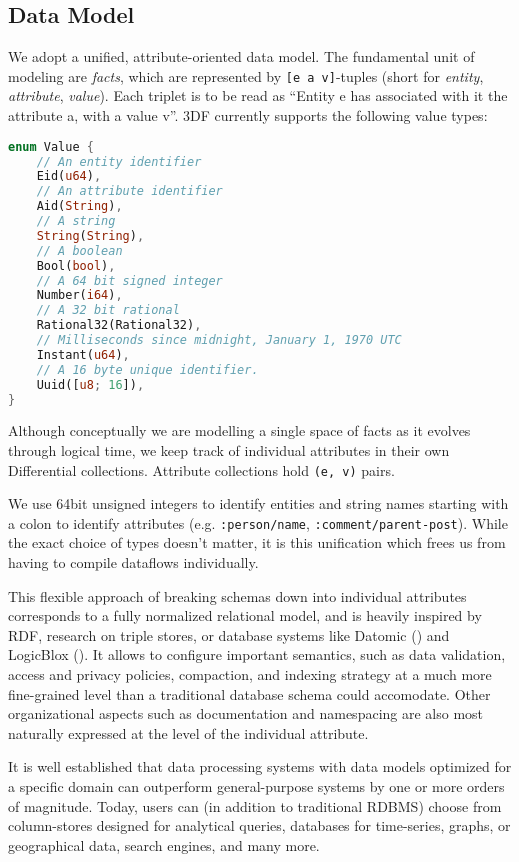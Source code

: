 \documentclass[../index.tex]{subfiles}
\begin{document}
\subsection{Data Model} \label{3df-data-model}

We adopt a unified, attribute-oriented data model. The fundamental
unit of modeling are \emph{facts}, which are represented by \texttt{[e
    a v]}-tuples (short for \emph{entity}, \emph{attribute},
\emph{value}). Each triplet is to be read as ``Entity e has associated
with it the attribute a, with a value v''. 3DF currently supports the
following value types:

\begin{lstlisting}[language=Rust, style=colouredRust]
enum Value {
    // An entity identifier
    Eid(u64),
    // An attribute identifier
    Aid(String),
    // A string
    String(String),
    // A boolean
    Bool(bool),
    // A 64 bit signed integer
    Number(i64),
    // A 32 bit rational
    Rational32(Rational32),
    // Milliseconds since midnight, January 1, 1970 UTC
    Instant(u64),
    // A 16 byte unique identifier.
    Uuid([u8; 16]),
}
\end{lstlisting}

Although conceptually we are modelling a single space of facts as it
evolves through logical time, we keep track of individual attributes
in their own Differential collections. Attribute collections hold
\texttt{(e, v)} pairs.

We use 64bit unsigned integers to identify entities and string names
starting with a colon to identify attributes
(e.g. \texttt{:person/name}, \texttt{:comment/parent-post}). While the
exact choice of types doesn't matter, it is this unification which
frees us from having to compile dataflows individually.

This flexible approach of breaking schemas down into individual
attributes corresponds to a fully normalized relational model, and is
heavily inspired by RDF, research on triple stores, or database
systems like Datomic (\cite{datomic}) and LogicBlox
(\cite{aref2015design}). It allows to configure important semantics,
such as data validation, access and privacy policies, compaction, and
indexing strategy at a much more fine-grained level than a traditional
database schema could accomodate. Other organizational aspects such as
documentation and namespacing are also most naturally expressed at the
level of the individual attribute.

It is well established that data processing systems with data models
optimized for a specific domain can outperform general-purpose systems
by one or more orders of magnitude. Today, users can (in addition to
traditional RDBMS) choose from column-stores designed for analytical
queries, databases for time-series, graphs, or geographical data,
search engines, and many more.
\end{document}
